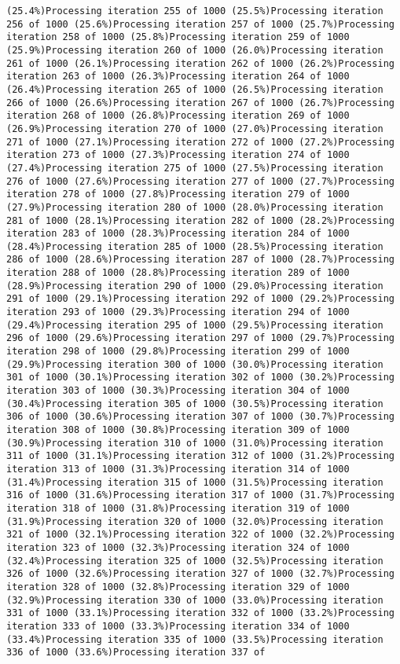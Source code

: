 \documentclass[
]{article}
\begin{document}
\begin{verbatim}
(25.4%)Processing iteration 255 of 1000 (25.5%)Processing iteration 256 of 1000 (25.6%)Processing iteration 257 of 1000 (25.7%)Processing iteration 258 of 1000 (25.8%)Processing iteration 259 of 1000 (25.9%)Processing iteration 260 of 1000 (26.0%)Processing iteration 261 of 1000 (26.1%)Processing iteration 262 of 1000 (26.2%)Processing iteration 263 of 1000 (26.3%)Processing iteration 264 of 1000 (26.4%)Processing iteration 265 of 1000 (26.5%)Processing iteration 266 of 1000 (26.6%)Processing iteration 267 of 1000 (26.7%)Processing iteration 268 of 1000 (26.8%)Processing iteration 269 of 1000 (26.9%)Processing iteration 270 of 1000 (27.0%)Processing iteration 271 of 1000 (27.1%)Processing iteration 272 of 1000 (27.2%)Processing iteration 273 of 1000 (27.3%)Processing iteration 274 of 1000 (27.4%)Processing iteration 275 of 1000 (27.5%)Processing iteration 276 of 1000 (27.6%)Processing iteration 277 of 1000 (27.7%)Processing iteration 278 of 1000 (27.8%)Processing iteration 279 of 1000 (27.9%)Processing iteration 280 of 1000 (28.0%)Processing iteration 281 of 1000 (28.1%)Processing iteration 282 of 1000 (28.2%)Processing iteration 283 of 1000 (28.3%)Processing iteration 284 of 1000 (28.4%)Processing iteration 285 of 1000 (28.5%)Processing iteration 286 of 1000 (28.6%)Processing iteration 287 of 1000 (28.7%)Processing iteration 288 of 1000 (28.8%)Processing iteration 289 of 1000 (28.9%)Processing iteration 290 of 1000 (29.0%)Processing iteration 291 of 1000 (29.1%)Processing iteration 292 of 1000 (29.2%)Processing iteration 293 of 1000 (29.3%)Processing iteration 294 of 1000 (29.4%)Processing iteration 295 of 1000 (29.5%)Processing iteration 296 of 1000 (29.6%)Processing iteration 297 of 1000 (29.7%)Processing iteration 298 of 1000 (29.8%)Processing iteration 299 of 1000 (29.9%)Processing iteration 300 of 1000 (30.0%)Processing iteration 301 of 1000 (30.1%)Processing iteration 302 of 1000 (30.2%)Processing iteration 303 of 1000 (30.3%)Processing iteration 304 of 1000 (30.4%)Processing iteration 305 of 1000 (30.5%)Processing iteration 306 of 1000 (30.6%)Processing iteration 307 of 1000 (30.7%)Processing iteration 308 of 1000 (30.8%)Processing iteration 309 of 1000 (30.9%)Processing iteration 310 of 1000 (31.0%)Processing iteration 311 of 1000 (31.1%)Processing iteration 312 of 1000 (31.2%)Processing iteration 313 of 1000 (31.3%)Processing iteration 314 of 1000 (31.4%)Processing iteration 315 of 1000 (31.5%)Processing iteration 316 of 1000 (31.6%)Processing iteration 317 of 1000 (31.7%)Processing iteration 318 of 1000 (31.8%)Processing iteration 319 of 1000 (31.9%)Processing iteration 320 of 1000 (32.0%)Processing iteration 321 of 1000 (32.1%)Processing iteration 322 of 1000 (32.2%)Processing iteration 323 of 1000 (32.3%)Processing iteration 324 of 1000 (32.4%)Processing iteration 325 of 1000 (32.5%)Processing iteration 326 of 1000 (32.6%)Processing iteration 327 of 1000 (32.7%)Processing iteration 328 of 1000 (32.8%)Processing iteration 329 of 1000 (32.9%)Processing iteration 330 of 1000 (33.0%)Processing iteration 331 of 1000 (33.1%)Processing iteration 332 of 1000 (33.2%)Processing iteration 333 of 1000 (33.3%)Processing iteration 334 of 1000 (33.4%)Processing iteration 335 of 1000 (33.5%)Processing iteration 336 of 1000 (33.6%)Processing iteration 337 of 
\end{verbatim}
\end{document}
